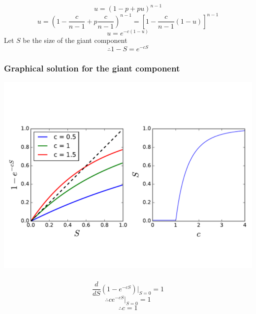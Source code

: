 \documentclass{beamer}
\begin{document}
\begin{frame}
    \frametitle{}
    \justifying
    $$u = (1-p+pu)^{n-1}$$
    \vspace{0.5em}
    $$u = \left(1-\frac{c}{n-1}+p\frac{c}{n-1}\right)^{n-1} = \left[1-\frac{c}{n-1}(1-u)\right]^{n-1}$$
    \vspace{0.5em}
    $$u = e^{-c(1-u)}$$
    \vspace{0.5em}
    Let $S$ be the size of the giant component
    \vspace{0.5em}
    $$\therefore 1-S = e^{-cS}$$
\end{frame}
\begin{frame}
    \frametitle{Graphical solution for the giant component}
    \centering
    \includegraphics[width=\columnwidth]{giant_component.pdf}
\end{frame}
\begin{frame}
    \frametitle{}
    \centering
$$\frac{d}{dS}(1-e^{-cS})\Bigr|_{S = 0} = 1$$
\vspace{2em}
$$\therefore ce^{-cS}\Bigr|_{S = 0} = 1$$
\vspace{2em}
$$\therefore c = 1$$

\end{frame}
\end{document}
